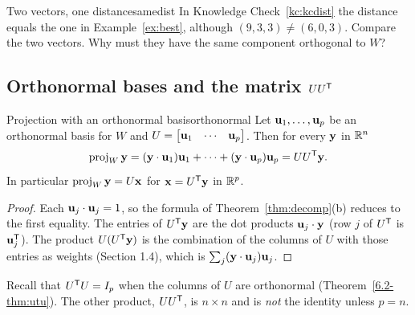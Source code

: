 \documentclass[11pt]{article}
\begin{document}
\begin{think}{Two vectors, one distance}{samedist}
In Knowledge Check~\ref{kc:kcdist} the distance equals the one in Example~\ref{ex:best}, although $(9,3,3)\neq(6,0,3)$. Compare the two vectors. Why must they have the same component orthogonal to $W$?
\end{think}

\subsection*{Orthonormal bases and the matrix $UU^{\mathsf T}$}

\begin{thm}{Projection with an orthonormal basis}{orthonormal}
Let $\mathbf{u}_1,\dots,\mathbf{u}_p$ be an orthonormal basis for $W$ and $U=\begin{bmatrix}\mathbf{u}_1&\cdots&\mathbf{u}_p\end{bmatrix}$. Then for every $\mathbf{y}$ in $\mathbb{R}^n$
\[
\operatorname{proj}_W\mathbf{y}=(\mathbf{y}\cdot\mathbf{u}_1)\mathbf{u}_1+\cdots+(\mathbf{y}\cdot\mathbf{u}_p)\mathbf{u}_p=UU^{\mathsf T}\mathbf{y} .
\]
In particular $\operatorname{proj}_W\mathbf{y}=U\mathbf{x}$ for $\mathbf{x}=U^{\mathsf T}\mathbf{y}$ in $\mathbb{R}^p$.
\end{thm}

\begin{proof}
Each $\mathbf{u}_j\cdot\mathbf{u}_j=1$, so the formula of Theorem~\ref{thm:decomp}(b) reduces to the first equality. The entries of $U^{\mathsf T}\mathbf{y}$ are the dot products $\mathbf{u}_j\cdot\mathbf{y}$ (row $j$ of $U^{\mathsf T}$ is $\mathbf{u}_j^{\mathsf T}$). The product $U(U^{\mathsf T}\mathbf{y})$ is the combination of the columns of $U$ with those entries as weights (Section 1.4), which is $\sum_j(\mathbf{y}\cdot\mathbf{u}_j)\mathbf{u}_j$.
\end{proof}

Recall that $U^{\mathsf T} U=I_p$ when the columns of $U$ are orthonormal (Theorem~\ref{6.2-thm:utu}). The other product, $UU^{\mathsf T}$, is $n\times n$ and is \emph{not} the identity unless $p=n$.
\end{document}
